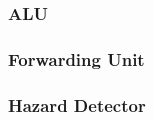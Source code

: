 
\subsubsection{ALU}
    

\subsubsection{Forwarding Unit}
    

\subsubsection{Hazard Detector}
    
